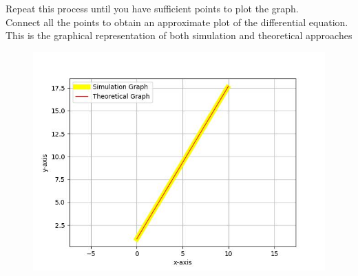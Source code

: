 \documentclass[journal]{IEEEtran}
\begin{document}
Repeat this process until you have sufficient points to plot the graph. \\

Connect all the points to obtain an approximate plot of the differential equation. \\

This is the graphical representation of both simulation and theoretical approaches \\

\begin{figure}[h!]
   \centering
   \includegraphics[width=\columnwidth]{fig/combined_fig.jpg}
\end{figure}
\end{document}
